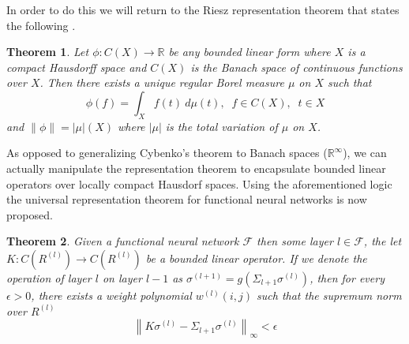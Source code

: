 \documentclass{article}
\newtheorem{theorem}{Theorem}
\begin{document}
In order to do this we will return to the Riesz representation theorem that states the following \cite{revisited}. 
\begin{theorem}
Let $\phi:C(X) \to \mathbb{R}$ be any bounded linear form where $X$ is a compact Hausdorff space and $C(X)$ is the Banach space of continuous functions over $X$. Then there exists a unique regular Borel measure $\mu$ on $X$ such that
\begin{equation}\phi(f) =\int_X f(t)\  d\mu(t),\; \; f\in C(X), \; \; t\in X\end{equation} and $\|\phi\| = |\mu|(X)$ where $|\mu|$ is the total variation of $\mu$ on $X$. 
\end{theorem}
As opposed to generalizing Cybenko's theorem to Banach spaces ($\mathbb{R}^\infty$), we can actually manipulate the representation theorem to encapsulate bounded linear operators over locally compact Hausdorf spaces. Using the aforementioned logic the universal representation theorem for functional neural networks is now proposed.
\begin{theorem}
Given a functional neural network $\mathcal{F}$ then some layer $l \in \mathcal{F}$, the let $K:C(R^{(l)})\to C(R^{(l)})$ be a bounded linear operator. If we denote the operation of layer $l$ on layer $l-1$ as $\sigma^{(l+1)} = g\left(\Sigma_{l+1}\sigma^{(l)}\right)$, then for every $\epsilon >0$, there exists a weight polynomial $w^{(l)}(i,j)$ such that the supremum norm over $R^{(l)}$ \begin{equation}\left\|K\sigma^{(l)} -\Sigma_{l+1}\sigma^{(l)}\right\|_{\infty} < \epsilon\end{equation}

\end{theorem}
\end{document}
